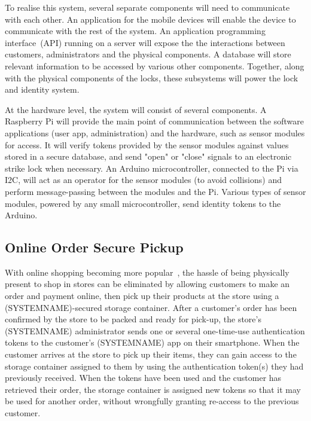\documentclass{article}
\begin{document}

To realise this system, several separate components will need to communicate with each other. An application for the
mobile devices will enable the device to communicate with the rest of the system. An application programming
interface~(API) running on a server will expose the the interactions between customers, administrators and the
physical components. A database will store relevant information to be accessed by various other components. Together,
along with the physical components of the locks, these subsystems will power the lock and identity system.


At the hardware level, the system will consist of several components. A Raspberry Pi will provide the main point of 
communication between the software applications (user app, administration) and the hardware, such as sensor modules for 
access. It will verify tokens provided by the sensor modules against values stored in a secure database, and send 
"open" or "close" signals to an electronic strike lock when necessary. An Arduino microcontroller, connected to the Pi 
via I2C, will act as an operator for the sensor modules (to avoid collisions) and perform message-passing between the 
modules and the Pi. Various types of sensor modules, powered by any small microcontroller, send identity tokens to the 
Arduino.

\subsection{Online Order Secure Pickup}

With online shopping becoming more popular~\autocite{CUSTORA}, the hassle of being physically present to shop in stores 
can be eliminated by allowing customers to make an order and payment online, then pick up their products at the store 
using a (SYSTEMNAME)-secured storage container. After a customer's order has been confirmed by the store to be packed 
and ready for pick-up, the store's (SYSTEMNAME) administrator sends one or several one-time-use authentication tokens 
to the customer's (SYSTEMNAME) app on their smartphone. When the customer arrives at the store to pick up their items, 
they can gain access to the storage container assigned to them by using the authentication token(s) they had previously 
received. When the tokens have been used and the customer has retrieved their order, the storage container is assigned 
new tokens so that it may be used for another order, without wrongfully granting re-access to the previous customer.
\end{document}
